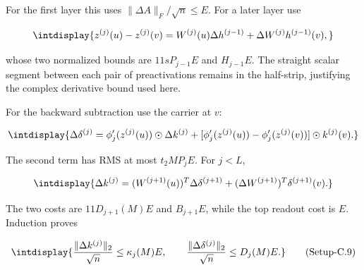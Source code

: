 
For the first layer this uses \(\|\Delta A\|_F/\sqrt n\le E\). For a later layer use


\begingroup\renewcommand{\theHequation}{intdisplay.926}
\begin{equation*}
\intdisplay{
z^{(j)}(u)-z^{(j)}(v)
=W^{(j)}(u)\Delta h^{(j-1)}+\Delta W^{(j)}h^{(j-1)}(v),
}
\end{equation*}
\endgroup


whose two normalized bounds are \(11sP_{j-1}E\) and \(H_{j-1}E\). The straight scalar segment between each pair of preactivations remains in the half-strip, justifying the complex derivative bound used here.



For the backward subtraction use the carrier at \(v\):


\begingroup\renewcommand{\theHequation}{intdisplay.927}
\begin{equation*}
\intdisplay{
\Delta\delta^{(j)}
=\phi_j'(z^{(j)}(u))\odot\Delta k^{(j)}
 +[\phi_j'(z^{(j)}(u))-\phi_j'(z^{(j)}(v))]\odot k^{(j)}(v).
}
\end{equation*}
\endgroup


The second term has RMS at most \(t_2MP_jE\). For \(j<L\),


\begingroup\renewcommand{\theHequation}{intdisplay.928}
\begin{equation*}
\intdisplay{
\Delta k^{(j)}
=(W^{(j+1)}(u))^T\Delta\delta^{(j+1)}
 +(\Delta W^{(j+1)})^T\delta^{(j+1)}(v).
}
\end{equation*}
\endgroup


The two costs are \(11D_{j+1}(M)E\) and \(B_{j+1}E\), while the top readout cost is \(E\). Induction proves


\label{int:eq-setup-c-9}
\begingroup\renewcommand{\theHequation}{intdisplay.929}
\begin{equation}
\intdisplay{
\frac{\|\Delta k^{(j)}\|_2}{\sqrt n}\le\kappa_j(M)E,
\qquad
\frac{\|\Delta\delta^{(j)}\|_2}{\sqrt n}\le D_j(M)E.
}
\tag{Setup-C.9}
\label{int:eq-0465-setup-c-9}
\end{equation}
\endgroup


